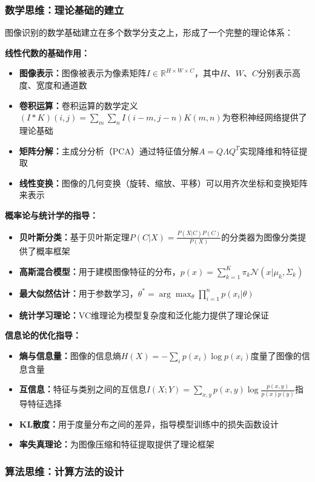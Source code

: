 \subsubsection{数学思维：理论基础的建立}

图像识别的数学基础建立在多个数学分支之上，形成了一个完整的理论体系：

\textbf{线性代数的基础作用：}
\begin{itemize}
\item \textbf{图像表示：}图像被表示为像素矩阵$I \in \mathbb{R}^{H \times W \times C}$，其中$H$、$W$、$C$分别表示高度、宽度和通道数
\item \textbf{卷积运算：}卷积运算的数学定义$(I * K)(i,j) = \sum_{m}\sum_{n} I(i-m, j-n)K(m,n)$为卷积神经网络提供了理论基础
\item \textbf{矩阵分解：}主成分分析（PCA）通过特征值分解$A = Q\Lambda Q^T$实现降维和特征提取
\item \textbf{线性变换：}图像的几何变换（旋转、缩放、平移）可以用齐次坐标和变换矩阵来表示
\end{itemize}

\textbf{概率论与统计学的指导：}
\begin{itemize}
\item \textbf{贝叶斯分类：}基于贝叶斯定理$P(C|X) = \frac{P(X|C)P(C)}{P(X)}$的分类器为图像分类提供了概率框架
\item \textbf{高斯混合模型：}用于建模图像特征的分布，$p(x) = \sum_{k=1}^K \pi_k \mathcal{N}(x|\mu_k, \Sigma_k)$
\item \textbf{最大似然估计：}用于参数学习，$\theta^* = \arg\max_\theta \prod_{i=1}^n p(x_i|\theta)$
\item \textbf{统计学习理论：}VC维理论为模型复杂度和泛化能力提供了理论保证
\end{itemize}

\textbf{信息论的优化指导：}
\begin{itemize}
\item \textbf{熵与信息量：}图像的信息熵$H(X) = -\sum_{i} p(x_i) \log p(x_i)$度量了图像的信息含量
\item \textbf{互信息：}特征与类别之间的互信息$I(X;Y) = \sum_{x,y} p(x,y) \log \frac{p(x,y)}{p(x)p(y)}$指导特征选择
\item \textbf{KL散度：}用于度量分布之间的差异，指导模型训练中的损失函数设计
\item \textbf{率失真理论：}为图像压缩和特征提取提供了理论框架
\end{itemize}

\subsubsection{算法思维：计算方法的设计}


